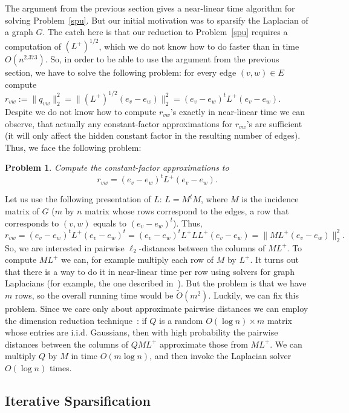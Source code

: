\documentclass[12pt]{article}
\newtheorem{problem}{Problem}
\begin{document}
    The argument from the previous section gives a near-linear time algorithm for solving
    Problem~\ref{spu}. But our initial motivation was to sparsify the Laplacian of a graph
    $G$. The catch here is that our reduction to Problem~\ref{spu} requires a computation
    of $(L^+)^{1/2}$, which we do not know how to do faster than in time $O(n^{2.373})$.
    So, in order to be able to use the argument from the previous section, we have to solve
    the following problem: for every edge $(v, w) \in E$ compute
    $r_{vw} := \|q_{vw}\|_2^2 =
    \|(L^+)^{1/2}(e_v - e_w)\|_2^2 = (e_v - e_w)^t L^+ (e_v - e_w)$.
    Despite we do not know how to compute $r_{vw}$'s exactly in near-linear time we can
    observe, that actually any constant-factor approximations for $r_{vw}$'s are sufficient
    (it will only affect the hidden constant factor in the resulting number of edges).
    Thus, we face the following problem:
    \begin{problem}
        Compute the constant-factor approximations to
        $$
            r_{vw} = (e_v - e_w)^t L^+ (e_v - e_w).
        $$
    \end{problem}

    Let us use the following presentation of $L$: $L = M^t M$, where $M$ is the incidence
    matrix of $G$ ($m$ by $n$ matrix whose rows correspond to the edges, a row that
    corresponds to $(v, w)$ equals to $(e_v - e_w)^t$). Thus,
    $$
        r_{vw} = (e_v - e_w)^t L^+ (e_v - e_w)^t = (e_v - e_w)^t L^+ L L^+ (e_v - e_w) =
        \|M L^+ (e_v - e_w)\|_2^2.
    $$
    So, we are interested in pairwise $\ell_2$-distances between the columns of
    $M L^+$.
    To compute $M L^+$ we can, for example multiply each row of $M$ by $L^+$. It turns
    out that there is a way to do it in near-linear time per row using solvers for graph
    Laplacians (for example, the one described in~\cite{KMP10}).
    But the problem is that we have $m$ rows, so the overall running time would be
    $\tilde{O}(m^2)$.
    Luckily, we can fix this problem. Since we care only about approximate pairwise
    distances we can employ the dimension reduction technique~\cite{DG03}:
    if $Q$ is a random
    $O(\log n) \times m$ matrix whose entries are i.i.d. Gaussians, then with
    high probability the pairwise distances between the columns of $QML^{+}$ approximate
    those from $ML^+$. We can multiply $Q$ by $M$ in time $O(m \log n)$, and then
    invoke the Laplacian solver $O(\log n)$ times.

    \subsection{Iterative Sparsification}
\end{document}
